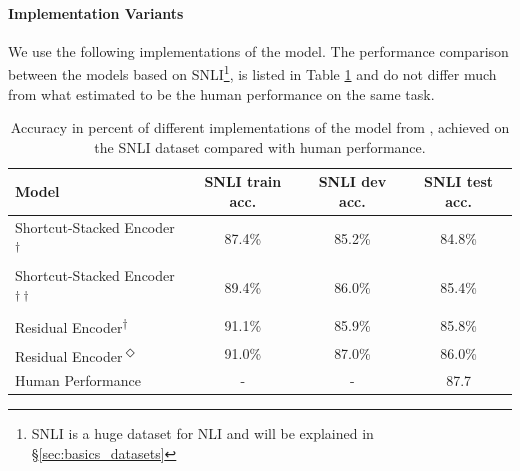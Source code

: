 \paragraph*{Implementation Variants}
We use the following implementations of the model. The performance comparison between the models based on SNLI\footnote{SNLI is a huge dataset for \ac{NLI} and will be explained in §\ref{sec:basics_datasets}}, is listed in Table \ref{table:reimplementation_performance} and do not differ much from what \cite{gong2017natural} estimated to be the human performance on the same task.
\begin{table}[!htbp]
\begin{center}
\begin{tabular}{lccc}
\textbf{Model} & \textbf{SNLI train acc.} & \textbf{SNLI dev acc.} & \textbf{SNLI test acc.}\\
\toprule
Shortcut-Stacked Encoder\textsuperscript{$\dagger$} & 87.4\% & 85.2\% & 84.8\% \\
Shortcut-Stacked Encoder\textsuperscript{$\dagger\dagger$} & 89.4\% & 86.0\% & 85.4\% \\
Residual Encoder\textsuperscript{$\dagger$} & 91.1\% & 85.9\% & 85.8\% \\
Residual Encoder\textsuperscript{$\Diamond$} & 91.0\% & 87.0\% & 86.0\% \\
\midrule
Human Performance \citep{gong2017natural} & - & - & 87.7 \\
\bottomrule
\end{tabular}
\caption{Accuracy in percent of different implementations of the model from \cite{nie2017shortcut}, achieved on the SNLI dataset compared with human performance.}
\label{table:reimplementation_performance}
\end{center}
\end{table}
